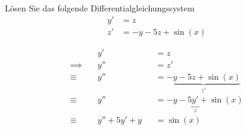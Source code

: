 \documentclass[answers]{exam}
\begin{document}
\begin{questions}
    \newpage
    \question
    Lösen Sie das folgende Differentialgleichungssystem
    $$
        \begin{aligned}
            y' & = z                \\
            z' & = -y -5z + \sin(x)
        \end{aligned}
    $$
    \begin{solution}
        $$
            \begin{aligned}
                               & y'            &  & = z                                  \\
                \implies \quad & y''           &  & = z'                                 \\
                \equiv \quad   & y''           &  & = \underbrace{-y -5z + \sin(x)}_{z'} \\
                \equiv \quad   & y''           &  & = -y -5\underbrace{y'}_{z} + \sin(x) \\
                \equiv \quad   & y'' + 5y' + y &  & =\sin(x)                             \\
            \end{aligned}
        $$


\end{solution}
\end{questions}
\end{document}
